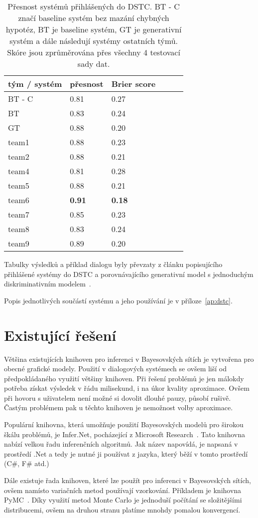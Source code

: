 \begin{table}[h]
\begin{center}
\begin{tabular}{|l|l|l|l|l|l|}
  \hline
tým / systém & přesnost & Brier score \\
\hline
BT - C         & 0.81 & 0.27\\
BT          & 0.83 & 0.24\\
GT          & 0.88 & 0.20\\
team1       & 0.88 & 0.23\\
team2       & 0.88 & 0.21\\
team4         & 0.81 & 0.28\\
team5         & 0.88 & 0.21\\
team6         & \textbf{0.91} & \textbf{0.18}\\
team7         & 0.85 & 0.23\\
team8         & 0.83 & 0.24\\
team9         & 0.89 & 0.20\\
\hline
\end{tabular}
\end{center}
\caption{Přesnost systémů přihlášených do DSTC. BT - C značí baseline systém bez mazání chybných hypotéz, BT je baseline systém, GT je generativní systém a dále následují systémy ostatních týmů. Skóre jsou zprůměrována přes všechny 4 testovací sady dat.}
\label{t:DSTC:ranking}
\end{table}

Tabulky výsledků a příklad dialogu byly převzaty z článku popisujícího přihlášené systémy do DSTC a porovnávajícího generativní model s jednoduchým diskriminativním modelem~\cite{zilka2013}.

Popis jednotlivých součástí systému a jeho používání je v příloze~\ref{ap:dstc}.

\section{Existující řešení}

Většina existujících knihoven pro inferenci v Bayesovských sítích je vytvořena pro obecné grafické modely.
Použití v dialogových systémech se ovšem liší od předpokládaného využití většiny knihoven.
Při řešení problémů je jen málokdy potřeba získat výsledek v řádu milisekund, i na úkor kvality aproximace.
Ovšem při hovoru s uživatelem není možné si dovolit dlouhé pauzy, působí rušivě.
Častým problémem pak u těchto knihoven je nemožnost volby aproximace.

Populární knihovna, která umožňuje použití Bayesovských modelů pro širokou škálu problémů, je Infer.Net, pocházející z Microsoft Research~\cite{InferNET12}.
Tato knihovna nabízí velkou řadu inferenčních algoritmů.
Jak název napovídá, je napsaná v prostředí .Net a tedy je nutné ji používat z jazyka, který běží v tomto prostředí (C\#, F\# atd.)

Dále existuje řada knihoven, které lze použít pro inferenci v Bayesovských sítích, ovšem namísto variačních metod používají vzorkování.
Příkladem je knihovna PyMC~\cite{patil2010pymc}. 
Díky využití metod Monte Carlo je jednoduší počítání se složitějšími distribucemi, ovšem na druhou stranu platíme mnohdy pomalou konvergencí.
